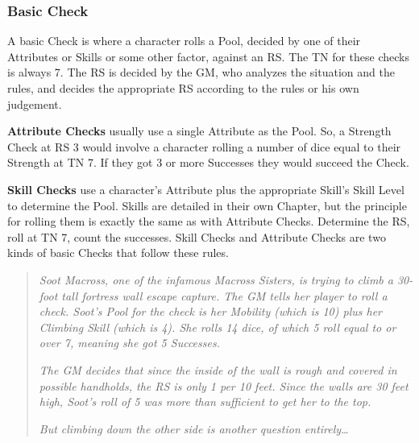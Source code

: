 \documentclass[oneside,11pt,english]{book}
\begin{document}
\subsubsection{Basic Check}
A basic Check is where a character rolls a Pool, decided by one of their Attributes or Skills or some other 
factor, against an RS. The TN for these checks is always 7. The RS is decided by the GM, who analyzes 
the situation and the rules, and decides the appropriate RS according to the rules or his own judgement.\par
\textbf{Attribute Checks} usually use a single Attribute as the Pool. So, a Strength Check at RS 3 would involve a 
character rolling a number of dice equal to their Strength at TN 7. If they got 3 or more Successes they 
would succeed the Check.\par
\textbf{Skill Checks} use a character’s Attribute plus the appropriate Skill’s Skill Level to determine the Pool. 
Skills are detailed in their own Chapter, but the principle for rolling them is exactly the same as with 
Attribute Checks. Determine the RS, roll at TN 7, count the successes. Skill Checks and Attribute Checks 
are two kinds of basic Checks that follow these rules.  
	\begin{quote}
			\emph{Soot Macross, one of the infamous Macross Sisters, is trying to climb a 30-foot tall fortress wall escape capture. The GM tells her player to roll a  check. Soot’s Pool for the check is her Mobility (which is 10) plus her Climbing Skill (which is 4). She rolls 14 dice, of which 5 roll equal to or over 7, meaning she got 5 Successes.}

			\emph{The GM decides that since the inside of the wall is rough and covered in possible handholds, the RS is only 1 per 10 feet. Since the walls are 30 feet high, Soot’s roll of 5 was more than sufficient to get her to the top.} 

			\emph{But climbing down the other side is another question entirely… }
	\end{quote}
\end{document}
